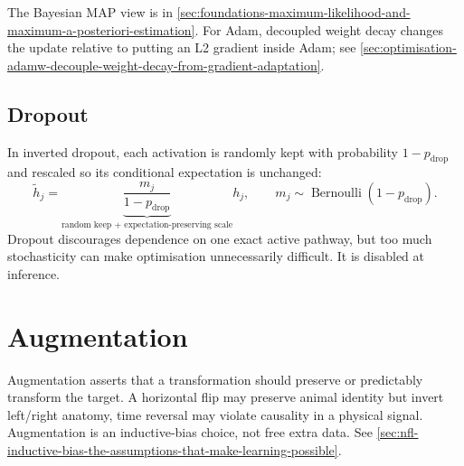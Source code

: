 The Bayesian MAP view is in \cref{sec:foundations-maximum-likelihood-and-maximum-a-posteriori-estimation}.
For Adam, decoupled weight decay changes the update relative to putting an L2 gradient inside Adam; see \cref{sec:optimisation-adamw-decouple-weight-decay-from-gradient-adaptation}.

\subsection{Dropout}
\label{sec:stability-dropout-and-stochastic-regularisation}
In inverted dropout, each activation is randomly kept with probability $1-p_{\text{drop}}$ and rescaled so its conditional expectation is unchanged:
\[
    \tilde h_j
    =
    \underbrace{\frac{m_j}{1-p_{\text{drop}}}}_{\text{random keep + expectation-preserving scale}}h_j,
    \qquad
    m_j\sim\operatorname{Bernoulli}(1-p_{\text{drop}}).
\]
Dropout discourages dependence on one exact active pathway, but too much stochasticity can make optimisation unnecessarily difficult.
It is disabled at inference.

\section{Augmentation}
\label{sec:stability-data-augmentation-and-symmetry-assumptions}
Augmentation asserts that a transformation should preserve or predictably transform the target.
A horizontal flip may preserve animal identity but invert left/right anatomy, time reversal may violate causality in a physical signal.
Augmentation is an inductive-bias choice, not free extra data.
See \cref{sec:nfl-inductive-bias-the-assumptions-that-make-learning-possible}.



